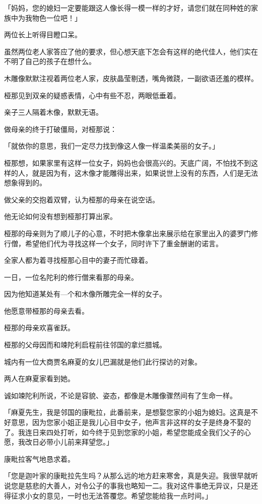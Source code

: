 \documentclass[twoside,openany]{book}
\begin{document}
「妈妈，您的媳妇一定要能跟这人像长得一模一样的才好，请您们就在同种姓的家族中为我物色一位吧！」

两位长上听得目瞪口呆。

虽然两位老人家答应了他的要求，但心想天底下怎会有这样的绝代佳人，他们实在不明了自己的孩子在想什么。

木雕像默默注视着两位老人家，皮肤晶莹剔透，嘴角微跷，一副欲语还羞的模样。

桠那见到双亲的疑惑表情，心中有些不忍，两眼低垂着。

亲子三人隔着木像，默默无语。

做母亲的终于打破僵局，对桠那说：

「就依你的意思，我们一定尽力找到像这人像一样温柔美丽的女子。」

桠那想，如果家里有这样一位女子，妈妈也会很高兴的。天底广阔，不怕找不到这样的人，就是因为有，这木像才能雕得出来，如果说世上没有的东西，人们是无法想象得到的。

做父亲的交抱着双臂，认为桠那的母亲在说空话。

他无论如何没有想到桠那打算出家。

桠那的母亲则为了顺儿子的心意，不时把木像拿出来展示给在家里出入的婆罗门修行僧，希望他们代为寻找这样一个女子，同时许下了重金酬谢的诺言。

全家人都为着寻找桠那心目中的妻子而忙碌着。

一日，一位名陀利的修行僧来看那的母亲。

因为他知道某处有—个和木像所雕完全一样的女子。

他愿意带桠那的母亲去看。

桠那的母亲欢喜雀跃。

桠那的父母因而和竦陀利启程前往邻国的拿烂腊城。

城内有一位大商贾名麻夏的女儿巴漏就是他们此行探访的对象。

两人在麻夏家看到她。

诚如竦陀利所说，不论是容貌、姿态，都像是木雕像骤然间有了生命一样。

「麻夏先生，我是邻国的康毗拉，此番前来，是想娶您家的小姐为媳妇。这真是不好意思，因为您家小姐正是我儿心目中女子，他声言非这样的女子是终身不娶的了。我连日来四处打听，如今终于见到您家的小姐，希望您能成全我们父子的心愿，我改日必带小儿前来拜望您。」

康毗拉客气地恳求着。

「您是迦叶家的康毗拉先生吗？从那么远的地方赶来寒舍，真是失迎。我很早就听说您是慈悲的大善人，对令公子的事我也略知一二。我对这件事绝无异议，只是还得征求小女的意见，一时也无法答覆您。希望您能给我一点时间。」
\end{document}
